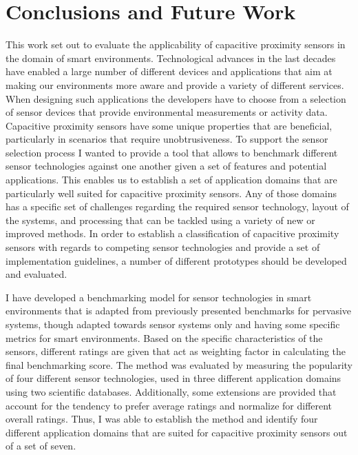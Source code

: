 \chapter{Conclusions and Future Work}
\label{ch:conclusion}

This work set out to evaluate the applicability of capacitive proximity sensors in the domain of smart environments. Technological advances in the last decades have enabled a large number of different devices and applications that aim at making our environments more aware and provide a variety of different services. When designing such applications the developers have to choose from a selection of sensor devices that provide environmental measurements or activity data. Capacitive proximity sensors have some unique properties that are beneficial, particularly in scenarios that require unobtrusiveness. To support the sensor selection process I wanted to provide a tool that allows to benchmark different sensor technologies against one another given a set of features and potential applications. This enables us to establish a set of application domains that are particularly well suited for capacitive proximity sensors. Any of those domains has a specific set of challenges regarding the required sensor technology, layout of the systems, and processing that can be tackled using a variety of new or improved methods. In order to establish a classification of capacitive proximity sensors with regards to competing sensor technologies and provide a set of implementation guidelines, a number of different prototypes should be developed and evaluated.

I have developed a benchmarking model for sensor technologies in smart environments that is adapted from previously presented benchmarks for pervasive systems, though adapted towards sensor systems only and having some specific metrics for smart environments. Based on the specific characteristics of the sensors, different ratings are given that act as weighting factor in calculating the final benchmarking score. The method was evaluated by measuring the popularity of four different sensor technologies, used in three different application domains using two scientific databases. Additionally, some extensions are provided that account for the tendency to prefer average ratings and normalize for different overall ratings. Thus, I was able to establish the method and identify four different application domains that are suited for capacitive proximity sensors out of a set of seven. 

